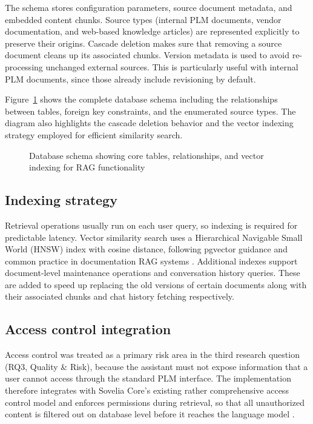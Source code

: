 The schema stores configuration parameters, source document metadata, and embedded content chunks. Source types (internal PLM documents, vendor documentation, and web-based knowledge articles) are represented explicitly to preserve their origins. Cascade deletion makes sure that removing a source document cleans up its associated chunks. Version metadata is used to avoid re-processing unchanged external sources. This is particularly useful with internal PLM documents, since those already include revisioning by default.

Figure~\ref{fig:database-schema} shows the complete database schema including the relationships between tables, foreign key constraints, and the enumerated source types. The diagram also highlights the cascade deletion behavior and the vector indexing strategy employed for efficient similarity search.

\begin{figure}[htbp]
    \centering
    \small{\resizebox{0.9\textwidth}{!}{}}
    \caption{Database schema showing core tables, relationships, and vector indexing for RAG functionality}
    \label{fig:database-schema}
\end{figure}

\subsection{Indexing strategy}
\label{subsec:indexing-strategy}

Retrieval operations usually run on each user query, so indexing is required for predictable latency. Vector similarity search uses a Hierarchical Navigable Small World (HNSW) index \cite{malkovEfficientRobustApproximate2016} with cosine distance, following pgvector guidance \parencite{PgvectorPgvector2025} and common practice in documentation RAG systems \parencite{zhongHoneyBeeEfficientRolebased2025}. Additional indexes support document-level maintenance operations and conversation history queries. These are added to speed up replacing the old versions of certain documents along with their associated chunks and chat history fetching respectively.

\subsection{Access control integration}
\label{subsec:access-control-integration}

Access control was treated as a primary risk area in the third research question (RQ3, Quality \& Risk), because the assistant must not expose information that a user cannot access through the standard PLM interface. The implementation therefore integrates with Sovelia Core's existing rather comprehensive access control model and enforces permissions during retrieval, so that all unauthorized content is filtered out on database level before it reaches the language model \parencite{jeongPermissionAwareRAGIdentity2025, zhongHoneyBeeEfficientRolebased2025}.

